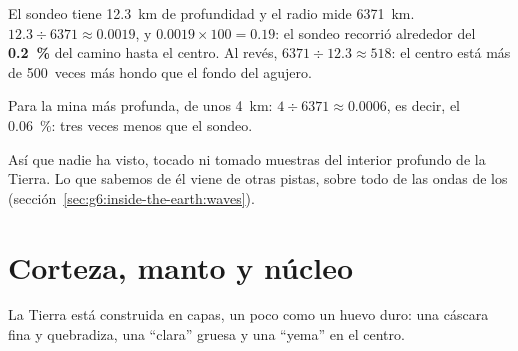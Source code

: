 \begin{example}\label{ex:g6:inside-the-earth:kola}
El sondeo tiene 12.3~km de profundidad y el radio mide 6371~km.
$12.3 \div 6371 \approx 0.0019$, y $0.0019 \times 100 = 0.19$: el sondeo
recorrió alrededor del \textbf{0.2~\%} del camino hasta el centro. Al
revés, $6371 \div 12.3 \approx 518$: el centro está más de 500~veces más
hondo que el fondo del agujero.

Para la mina más profunda, de unos 4~km: $4 \div 6371 \approx 0.0006$, es
decir, el 0.06~\%: tres veces menos que el sondeo.
\end{example}

Así que nadie ha visto, tocado ni tomado muestras del interior profundo de
la Tierra. Lo que sabemos de él viene de otras pistas, sobre todo de las
ondas de los  (sección~\ref{sec:g6:inside-the-earth:waves}).

\section{Corteza, manto y núcleo}

La Tierra está construida en capas, un poco como un huevo duro: una
cáscara fina y quebradiza, una ``clara'' gruesa y una ``yema'' en el centro.

